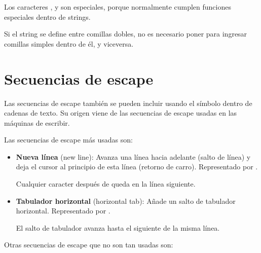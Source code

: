 Los caracteres \ttt{\q}, \ttt{\qq} y \ttt{\textbackslash} son especiales, porque normalmente cumplen funciones especiales dentro de strings.

Si el string se define entre comillas dobles, no es necesario poner \ttt{\q} para ingresar comillas simples dentro de él, y viceversa.


\section{Secuencias de escape}

Las secuencias de escape también se pueden incluir usando el símbolo \ttt{\textbackslash} dentro de cadenas de texto.
Su origen viene de las secuencias de escape usadas en las máquinas de escribir.

Las secuencias de escape más usadas son:

\begin{itemize}
  \item \textbf{Nueva línea} (new line): Avanza una línea hacia adelante (salto de línea) y deja el cursor al principio de esta línea (retorno de carro).
  Representado por .
  
  
  Cualquier caracter después de  queda en la línea siguiente.

  \item \textbf{Tabulador horizontal} (horizontal tab): Añade un salto de tabulador horizontal.
  Representado por .
  
  
  El salto de tabulador avanza hasta el siguiente  de la misma línea.

\end{itemize}

Otras secuencias de escape que no son tan usadas son:

